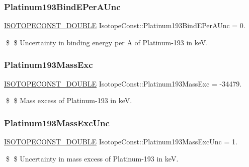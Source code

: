 \subsubsection{\texorpdfstring{Platinum193\+Bind\+E\+Per\+A\+Unc}{Platinum193BindEPerAUnc}}
{\footnotesize\ttfamily \mbox{\hyperlink{group___isotope_const-_macros_ga8f45a7272ce02c0b4c65c44636ed719a}{I\+S\+O\+T\+O\+P\+E\+C\+O\+N\+S\+T\+\_\+\+D\+O\+U\+B\+LE}} Isotope\+Const\+::\+Platinum193\+Bind\+E\+Per\+A\+Unc = 0.}

\$ \$ Uncertainty in binding energy per A of Platinum-\/193 in keV. \mbox{\label{group___isotope_const-_platinum-_pt193_ga36daaa1fbb62b88ad8a1c2a73b074db8}} 
\subsubsection{\texorpdfstring{Platinum193\+Mass\+Exc}{Platinum193MassExc}}
{\footnotesize\ttfamily \mbox{\hyperlink{group___isotope_const-_macros_ga8f45a7272ce02c0b4c65c44636ed719a}{I\+S\+O\+T\+O\+P\+E\+C\+O\+N\+S\+T\+\_\+\+D\+O\+U\+B\+LE}} Isotope\+Const\+::\+Platinum193\+Mass\+Exc = -\/34479.}

\$ \$ Mass excess of Platinum-\/193 in keV. \mbox{\label{group___isotope_const-_platinum-_pt193_ga823b558a0df891378c5a461c782d0050}} 
\subsubsection{\texorpdfstring{Platinum193\+Mass\+Exc\+Unc}{Platinum193MassExcUnc}}
{\footnotesize\ttfamily \mbox{\hyperlink{group___isotope_const-_macros_ga8f45a7272ce02c0b4c65c44636ed719a}{I\+S\+O\+T\+O\+P\+E\+C\+O\+N\+S\+T\+\_\+\+D\+O\+U\+B\+LE}} Isotope\+Const\+::\+Platinum193\+Mass\+Exc\+Unc = 1.}

\$ \$ Uncertainty in mass excess of Platinum-\/193 in keV. \mbox{\label{group___isotope_const-_platinum-_pt193_ga2debcdf6f23e0eb63dd89aaf9baec106}} 
